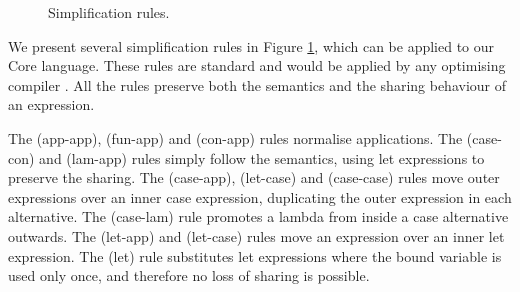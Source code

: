 \begin{figure}
\begin{simplify}

\end{simplify}
\caption{Simplification rules.}
\label{figB:simplify}
\end{figure}

We present several simplification rules in Figure \ref{figB:simplify}, which can be applied to our Core language. These rules are standard and would be applied by any optimising compiler \cite{spj:transformation}. All the rules preserve both the semantics and the sharing behaviour of an expression.

The (app-app), (fun-app) and (con-app) rules normalise applications. The (case-con) and (lam-app) rules simply follow the semantics, using let expressions to preserve the sharing. The (case-app), (let-case) and (case-case) rules move outer expressions over an inner case expression, duplicating the outer expression in each alternative. The (case-lam) rule promotes a lambda from inside a case alternative outwards. The (let-app) and (let-case) rules move an expression over an inner let expression. The (let) rule substitutes let expressions where the bound variable is used only once, and therefore no loss of sharing is possible.


